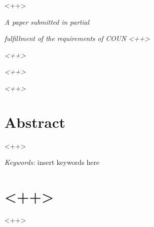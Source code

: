 \documentclass[12pt]{article}
\author{<++>}
\title{\papertitle}
\newcommand{\papertitle}{<++>}
\newcommand{\coursenumber}{<++>}
\newcommand{\coursetitle}{<++>}
\newcommand{\instructor}{<++>}
\newcommand{\duedate}{<++>}
\newcommand{\indentamount}{.4in}
\renewcommand{\maketitle}{
  \begin{center}
    \vspace*{150pt}

    \begin{singlespace}
      \papertitle

      \theauthor
    \end{singlespace}

    \vspace{50pt}

    \textit{A paper submitted in partial}

    \textit{fulfillment of the requirements of COUN}
    \textit{\coursenumber}

    \textit{\coursetitle}

    \textit{\instructor}

    \textit{\duedate}
  \end{center}
}
\begin{document}

\maketitle

\newpage



\section{Abstract}

\setlength{\parindent}{0pt}

<++>

\setlength{\parindent}{\indentamount}

\textit{Keywords:} insert keywords here

\newpage



\section{\papertitle}

<++>



\newpage

\printbibliography
\end{document}

